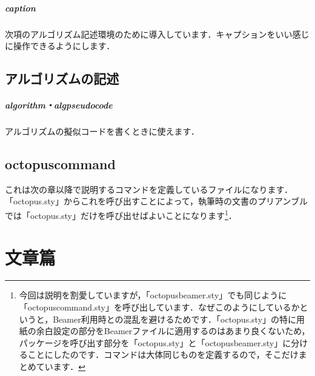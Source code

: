 \documentclass[uplatex]{jsreport}
\begin{document}
\paragraph{caption} 次項のアルゴリズム記述環境のために導入しています．キャプションをいい感じに操作できるようにします\cite{caption}．

\section{アルゴリズムの記述}
\paragraph{algorithm・algpseudocode} アルゴリズムの擬似コードを書くときに使えます\cite{algorithms,algorithmicx}．

\section{octopuscommand}
これは次の章以降で説明するコマンドを定義しているファイルになります．「octopus.sty」からこれを呼び出すことによって，執筆時の文書のプリアンブルでは「octopus.sty」だけを呼び出せばよいことになります\footnote{今回は説明を割愛していますが，「octopusbeamer.sty」でも同じように「octopuscommand.sty」を呼び出しています．なぜこのようにしているかというと，Beamer利用時との混乱を避けるためです．「octopus.sty」の特に用紙の余白設定の部分をBeamerファイルに適用するのはあまり良くないため，パッケージを呼び出す部分を「octopus.sty」と「octopusbeamer.sty」に分けることにしたのです．コマンドは大体同じものを定義するので，そこだけまとめています．}．

\chapter{文章篇}
\end{document}

